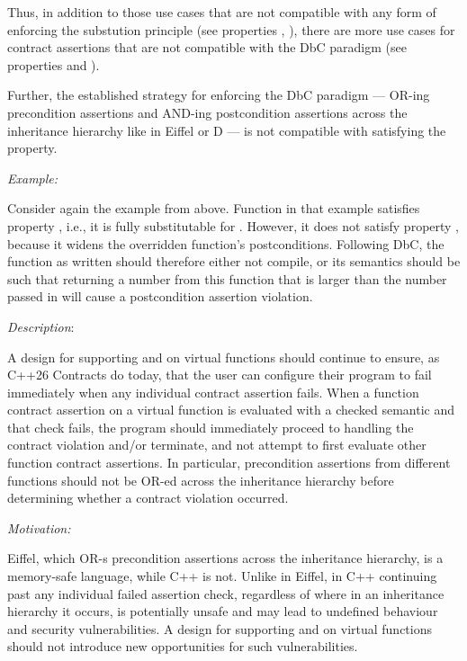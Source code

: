 Thus,  in addition to those use cases that are not compatible with any form of enforcing the substution principle (see properties , ), there are more use cases for contract assertions that are not compatible with the DbC paradigm (see properties   and ).

Further, the established strategy for enforcing the DbC paradigm --- OR-ing precondition assertions and AND-ing postcondition assertions across the inheritance hierarchy like in Eiffel or D --- is not compatible with satisfying the  property.


\emph{Example:}

Consider again the example from  above. Function  in that example satisfies property , i.e., it is fully substitutable for . However, it does not satisfy property , because it widens the overridden function's postconditions. Following DbC, the function  as written should therefore either not compile, or its semantics should be such that returning a number from this function that is larger than the number passed in will cause a postcondition assertion violation.


\emph{Description}:

A design for supporting  and  on virtual functions should continue to ensure, as C++26 Contracts do today, that the user can configure their program to fail immediately when any individual contract assertion fails. When a function contract assertion on a virtual function is evaluated with a checked semantic and that check fails, the program should immediately proceed to handling the contract violation and/or terminate, and not attempt to first evaluate other function contract assertions. In particular, precondition assertions from different functions should not be OR-ed across the inheritance hierarchy before determining whether a contract violation occurred.

\emph{Motivation:}

Eiffel, which OR-s precondition assertions across the inheritance hierarchy, is a memory-safe language, while C++ is not. Unlike in Eiffel, in C++ continuing past any individual failed assertion check, regardless of where in an inheritance hierarchy it occurs, is potentially unsafe and may lead to undefined behaviour and security vulnerabilities. A design for supporting  and  on virtual functions should not introduce new opportunities for such vulnerabilities.

